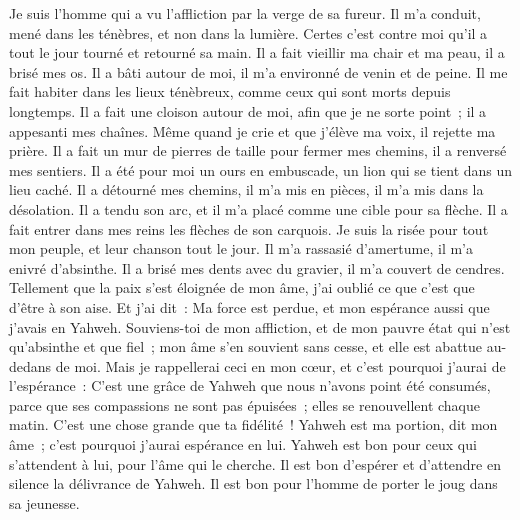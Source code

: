 \begin{multicols}{2}
\VerseOne{} Je suis l'homme qui a vu l'affliction par la verge de sa fureur.
Il m'a conduit, mené dans les ténèbres, et non dans la lumière.
Certes c'est contre moi qu'il a tout le jour tourné et retourné sa main.
 Il a fait vieillir ma chair et ma peau, il a brisé mes os.
Il a bâti autour de moi, il m'a environné de venin et de peine.
Il me fait habiter dans les lieux ténèbreux, comme ceux qui sont morts depuis longtemps.
 Il a fait une cloison autour de moi, afin que je ne sorte point~; il a appesanti mes chaînes.
Même quand je crie et que j'élève ma voix, il rejette ma prière.
Il a fait un mur de pierres de taille pour fermer mes chemins, il a renversé mes sentiers.
 Il a été pour moi un ours en embuscade, un lion qui se tient dans un lieu caché.
Il a détourné mes chemins, il m'a mis en pièces, il m'a mis dans la désolation.
Il a tendu son arc, et il m'a placé comme une cible pour sa flèche.
 Il a fait entrer dans mes reins les flèches de son carquois.
Je suis la risée pour tout mon peuple, et leur chanson tout le jour.
Il m'a rassasié d'amertume, il m'a enivré d'absinthe.
 Il a brisé mes dents avec du gravier, il m'a couvert de cendres.
Tellement que la paix s'est éloignée de mon âme, j'ai oublié ce que c'est que d'être à son aise.
Et j'ai dit~: Ma force est perdue, et mon espérance aussi que j'avais en Yahweh.
 Souviens-toi de mon affliction, et de mon pauvre état qui n'est qu'absinthe et que fiel~;
mon âme s'en souvient sans cesse, et elle est abattue au-dedans de moi.
Mais je rappellerai ceci en mon cœur, et c'est pourquoi j'aurai de l'espérance~:
 C'est une grâce de Yahweh que nous n'avons point été consumés, parce que ses compassions ne sont pas épuisées~;
elles se renouvellent chaque matin. C'est une chose grande que ta fidélité~!
Yahweh est ma portion, dit mon âme~; c'est pourquoi j'aurai espérance en lui.
 Yahweh est bon pour ceux qui s'attendent à lui, pour l'âme qui le cherche.
Il est bon d'espérer et d'attendre en silence la délivrance de Yahweh.
Il est bon pour l'homme de porter le joug dans sa jeunesse.

\end{multicols}
